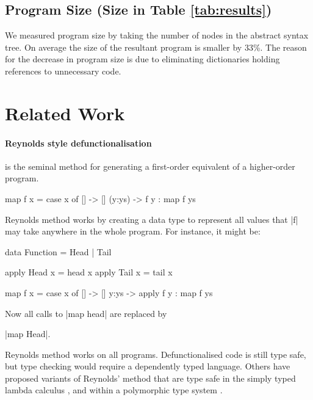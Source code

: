 \subsection{Program Size (Size in Table \ref{tab:results})}

We measured program size by taking the number of nodes in the abstract syntax tree. On average the size of the resultant program is smaller by 33\%. The reason for the decrease in program size is due to eliminating dictionaries holding references to unnecessary code.


\section{Related Work}
\label{sec:related}

\paragraph{Reynolds style defunctionalisation} \cite{reynolds:defunc} is the seminal method for generating a first-order equivalent of a higher-order program.

\begin{example}
\begin{code}
map f x = case  x of
                []      -> []
                (y:ys)  -> f y : map f ys
\end{code}

\noindent Reynolds method works by creating a data type to represent all values that |f| may take anywhere in the whole program. For instance, it might be:

\ignore\begin{code}
data Function = Head | Tail

apply Head  x = head  x
apply Tail  x = tail  x

map f x = case  x of
                []    -> []
                y:ys  -> apply f y : map f ys
\end{code}

\noindent Now all calls to |map head| are replaced by \ignore|map Head|.
\end{example}

Reynolds method works on all programs. Defunctionalised code is still type safe, but type checking would require a dependently typed language. Others have proposed variants of Reynolds' method that are type safe in the simply typed lambda calculus \cite{bell:type_driven_defunctionalization}, and within a polymorphic type system \cite{pottier:polymorhpic_typed_defunctionaization}.

